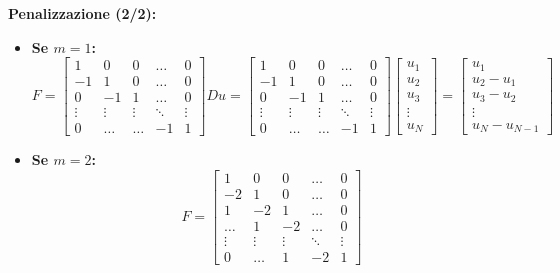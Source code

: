 \noindent\textbf{Penalizzazione (2/2):}
\begin{itemize}
    \item \textbf{Se $m = 1$:}
    \[
        F = \begin{bmatrix}
            1 & 0 & 0 & \dots & 0 \\
            -1 & 1 & 0 & \dots & 0 \\
            0 & -1 & 1 & \dots & 0 \\
            \vdots & \vdots & \vdots & \ddots & \vdots \\
            0 & \dots & \dots & -1 & 1
        \end{bmatrix}
        Du = \begin{bmatrix}
            1 & 0 & 0 & \dots & 0 \\
            -1 & 1 & 0 & \dots & 0 \\
            0 & -1 & 1 & \dots & 0 \\
            \vdots & \vdots & \vdots & \ddots & \vdots \\
            0 & \dots & \dots & -1 & 1
        \end{bmatrix}
        \begin{bmatrix}
            u_1 \\
            u_2 \\
            u_3 \\
            \vdots \\
            u_N
        \end{bmatrix}
        =
        \begin{bmatrix}
            u_1 \\
            u_2 - u_1 \\
            u_3 - u_2 \\
            \vdots \\
            u_N - u_{N-1}
        \end{bmatrix}
    \]
    \item \textbf{Se $m = 2$:}
    \[
        F = \begin{bmatrix}
            1 & 0 & 0 & \dots & 0 \\
            -2 & 1 & 0 & \dots & 0 \\
            1 & -2 & 1 & \dots & 0 \\
            \dots & 1 & -2 & \dots & 0 \\
            \vdots & \vdots & \vdots & \ddots & \vdots \\
            0 & \dots & 1 & -2 & 1
        \end{bmatrix}
\]
\end{itemize}
